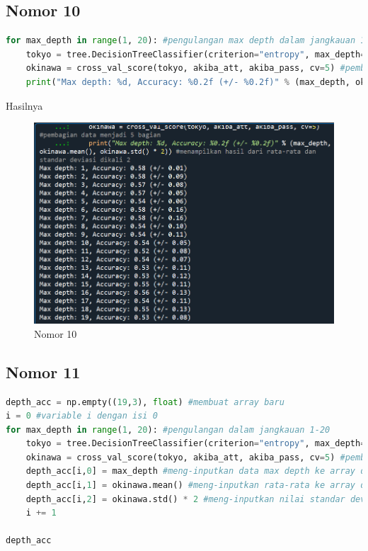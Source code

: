\subsection{Nomor 10}

\begin{lstlisting}[language=Python]
for max_depth in range(1, 20): #pengulangan max depth dalam jangkauan 1-20
    tokyo = tree.DecisionTreeClassifier(criterion="entropy", max_depth=max_depth) #membuat decision tree 
    okinawa = cross_val_score(tokyo, akiba_att, akiba_pass, cv=5) #pembagian data menjadi 5 bagian
    print("Max depth: %d, Accuracy: %0.2f (+/- %0.2f)" % (max_depth, okinawa.mean(), okinawa.std() * 2)) #menampilkan hasil dari rata-rata dan standar deviasi dikali 2
\end{lstlisting}

\par Hasilnya

\begin{figure}[H]
    \centering
    \includegraphics[width=12cm]{figures/chapter2/30.PNG}
    \caption{Nomor 10}
\end{figure}

\subsection{Nomor 11}

\begin{lstlisting}[language=Python]
depth_acc = np.empty((19,3), float) #membuat array baru
i = 0 #variable i dengan isi 0
for max_depth in range(1, 20): #pengulangan dalam jangkauan 1-20
    tokyo = tree.DecisionTreeClassifier(criterion="entropy", max_depth=max_depth) #membuat decision tree
    okinawa = cross_val_score(tokyo, akiba_att, akiba_pass, cv=5) #pembagian data menjadi 5 bagian 
    depth_acc[i,0] = max_depth #meng-inputkan data max depth ke array depth acc
    depth_acc[i,1] = okinawa.mean() #meng-inputkan rata-rata ke array depth acc 
    depth_acc[i,2] = okinawa.std() * 2 #meng-inputkan nilai standar deviasi ke array depth acc
    i += 1

depth_acc
\end{lstlisting}

